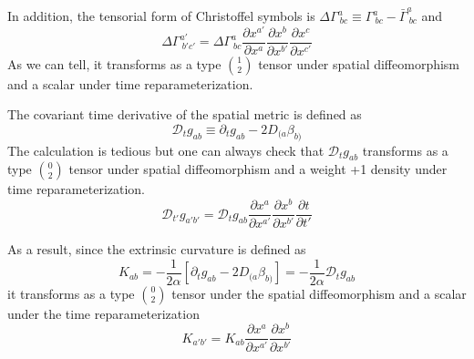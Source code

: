 \documentclass[letterpaper,nofootinbib,prd,amsmath,onecolumn]{revtex4-1}
\begin{document}
In addition, the tensorial form of Christoffel symbols is $\Delta \Gamma^{a}_{~bc} \equiv \Gamma^{a}_{~bc} - {\bar \Gamma}^{a}_{~bc}$ and
\begin{equation}
\Delta \Gamma^{a'}_{~b'c'} = \Delta \Gamma^{a}_{~bc}\frac{\partial x^{a'}}{\partial x^{a}}\frac{\partial x^{b}}{\partial x^{b'}}\frac{\partial x^{c}}{\partial x^{c'}}
\end{equation}
As we can tell, it transforms as a type $1 \choose 2$ tensor under spatial diffeomorphism and a scalar under time reparameterization. 

The covariant time derivative of the spatial metric is defined as
\begin{equation}
\mathscr{D}_{t}g_{ab} \equiv \partial_{t}g_{ab} - 2D_{(a}\beta_{b)}
\end{equation}
The calculation is tedious but one can always check that $\mathscr{D}_{t}g_{ab}$ transforms as a type $0 \choose 2$ tensor under spatial diffeomorphism and a weight +1 density under time reparameterization. 
\begin{equation}
\mathscr{D}_{t'}g_{a'b'} = \mathscr{D}_{t}g_{ab}\frac{\partial x^{a}}{\partial x^{a'}}\frac{\partial x^{b}}{\partial x^{b'}}\frac{\partial t}{\partial t'}
\end{equation}

As a result, since the extrinsic curvature is defined as
\begin{equation}
K_{ab} = -\frac{1}{2\alpha}\left[\partial_{t}g_{ab} - 2D_{(a}\beta_{b)}\right] = -\frac{1}{2\alpha}\mathscr{D}_{t}g_{ab}
\end{equation}
it transforms as a type $0 \choose 2$ tensor under the spatial diffeomorphism and a scalar under the time reparameterization
\begin{equation}
K_{a'b'} = K_{ab}\frac{\partial x^{a}}{\partial x^{a'}}\frac{\partial x^{b}}{\partial x^{b'}}
\end{equation}
\end{document}
